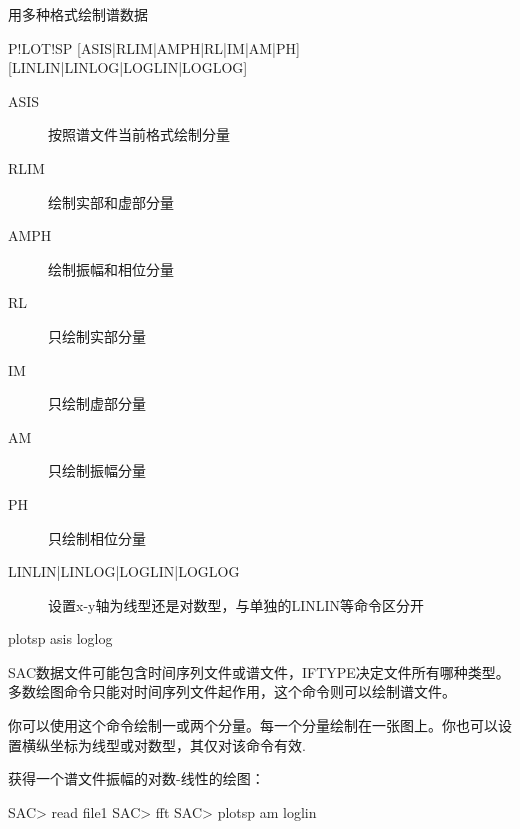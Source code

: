 \label{cmd:plotsp}

用多种格式绘制谱数据

\begin{SACSTX}
P!LOT!SP [ASIS|RLIM|AMPH|RL|IM|AM|PH] [LINLIN|LINLOG|LOGLIN|LOGLOG]
\end{SACSTX}

\begin{description}
\item [ASIS]  按照谱文件当前格式绘制分量
\item [RLIM]  绘制实部和虚部分量
\item [AMPH]  绘制振幅和相位分量
\item [RL] 只绘制实部分量
\item [IM]  只绘制虚部分量
\item [AM]  只绘制振幅分量
\item [PH]  只绘制相位分量
\item [LINLIN|LINLOG|LOGLIN|LOGLOG] 设置x-y轴为线型还是对数型，与单独的LINLIN等命令区分开
\end{description}

\begin{SACDFT}
plotsp asis loglog
\end{SACDFT}

SAC数据文件可能包含时间序列文件或谱文件，IFTYPE决定文件所有哪种类型。多数绘图命令只能对时间序列文件起作用，这个命令则可以绘制谱文件。

你可以使用这个命令绘制一或两个分量。每一个分量绘制在一张图上。你也可以设置横纵坐标为线型或对数型，其仅对该命令有效.

获得一个谱文件振幅的对数-线性的绘图：
\begin{SACCode}
SAC> read file1
SAC> fft
SAC> plotsp am loglin
\end{SACCode}
